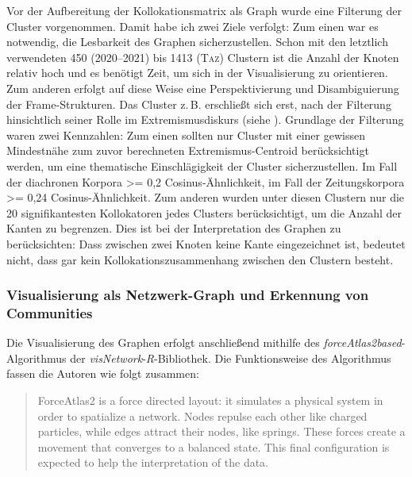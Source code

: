 Vor der Aufbereitung der Kollokationsmatrix als Graph wurde eine Filterung der Cluster vorgenommen. Damit habe ich zwei Ziele verfolgt: Zum einen war es notwendig, die Lesbarkeit des Graphen sicherzustellen. Schon mit den letztlich verwendeten 450 (2020--2021) bis 1413 (\textsc{Taz}) Clustern ist die Anzahl der Knoten relativ hoch und es benötigt Zeit, um sich in der Visualisierung zu orientieren. Zum anderen erfolgt auf diese Weise eine Perspektivierung und Disambiguierung der Frame-Strukturen. Das Cluster  z.\,B. erschließt sich erst, nach der Filterung hinsichtlich seiner Rolle im Extremismusdiskurs (siehe ). Grundlage der Filterung waren zwei Kennzahlen: Zum einen sollten nur Cluster mit einer gewissen Mindestnähe zum zuvor berechneten Extremismus-Centroid berücksichtigt werden, um eine thematische Einschlägigkeit der Cluster sicherzustellen. Im Fall der diachronen Korpora \textgreater= 0,2 Cosinus-Ähnlichkeit, im Fall der Zeitungskorpora \textgreater= 0,24 Cosinus-Ähnlichkeit. Zum anderen wurden unter diesen Clustern nur die 20 signifikantesten Kollokatoren jedes Clusters berücksichtigt, um die Anzahl der Kanten zu begrenzen. Dies ist bei der Interpretation des Graphen zu berücksichten: Dass zwischen zwei Knoten keine Kante eingezeichnet ist, bedeutet nicht, dass gar kein Kollokationszusammenhang zwischen den Clustern besteht.

\subsubsection{Visualisierung als Netzwerk-Graph und Erkennung von Communities}\label{visualisierung-als-netzwerk-graph-und-erkennung-von-communities}

Die Visualisierung des Graphen erfolgt anschließend mithilfe des \emph{forceAtlas2based}-Algorithmus \autocite{jacomyForceAtlas2ContinuousGraph2014} der \emph{visNetwork}-\emph{R}-Bibliothek. Die Funktionsweise des Algorithmus fassen die Autoren wie folgt zusammen:

\begin{quote}
ForceAtlas2 is a force directed layout: it simulates a physical system in order to spatialize a network. Nodes repulse each other like charged particles, while edges attract their nodes, like springs. These forces create a movement that converges to a balanced state. This final configuration is expected to help the interpretation of the data. \autocite[2]{jacomyForceAtlas2ContinuousGraph2014}
\end{quote}


